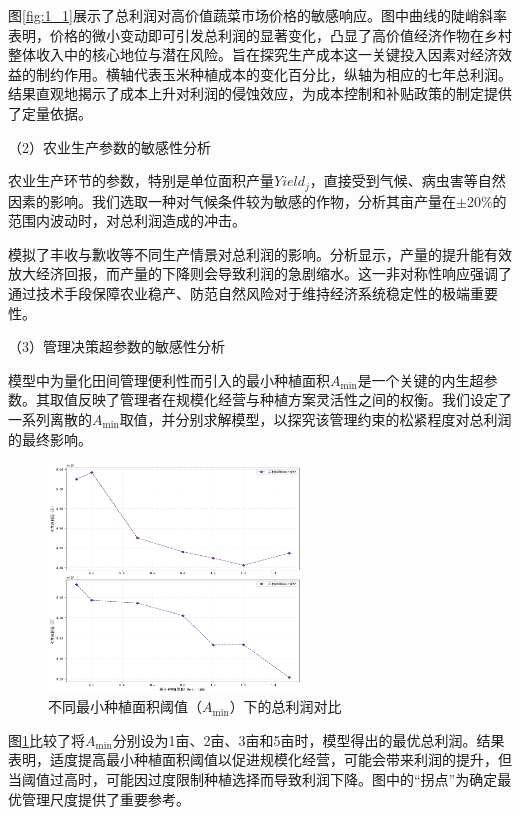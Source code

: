 \documentclass[withoutpreface,bwprint]{cumcmthesis} %
\begin{document}
图\ref{fig:1_1}展示了总利润对高价值蔬菜市场价格的敏感响应。图中曲线的陡峭斜率表明，价格的微小变动即可引发总利润的显著变化，凸显了高价值经济作物在乡村整体收入中的核心地位与潜在风险。旨在探究生产成本这一关键投入因素对经济效益的制约作用。横轴代表玉米种植成本的变化百分比，纵轴为相应的七年总利润。结果直观地揭示了成本上升对利润的侵蚀效应，为成本控制和补贴政策的制定提供了定量依据。

（2）农业生产参数的敏感性分析

农业生产环节的参数，特别是单位面积产量$Yield_j$，直接受到气候、病虫害等自然因素的影响。我们选取一种对气候条件较为敏感的作物，分析其亩产量在$\pm$20\%的范围内波动时，对总利润造成的冲击。


模拟了丰收与歉收等不同生产情景对总利润的影响。分析显示，产量的提升能有效放大经济回报，而产量的下降则会导致利润的急剧缩水。这一非对称性响应强调了通过技术手段保障农业稳产、防范自然风险对于维持经济系统稳定性的极端重要性。

（3）管理决策超参数的敏感性分析

模型中为量化田间管理便利性而引入的最小种植面积$A_{\min}$是一个关键的内生超参数。其取值反映了管理者在规模化经营与种植方案灵活性之间的权衡。我们设定了一系列离散的$A_{\min}$取值，并分别求解模型，以探究该管理约束的松紧程度对总利润的最终影响。


\begin{figure}[htbp]
    \centering
    \includegraphics[width=0.6\textwidth]{figures/1_2.png}
    \caption{不同最小种植面积阈值（$A_{\min}$）下的总利润对比}
    \label{fig:1_2}
\end{figure}

图\ref{fig:1_2}比较了将$A_{\min}$分别设为1亩、2亩、3亩和5亩时，模型得出的最优总利润。结果表明，适度提高最小种植面积阈值以促进规模化经营，可能会带来利润的提升，但当阈值过高时，可能因过度限制种植选择而导致利润下降。图中的“拐点”为确定最优管理尺度提供了重要参考。
\end{document}
